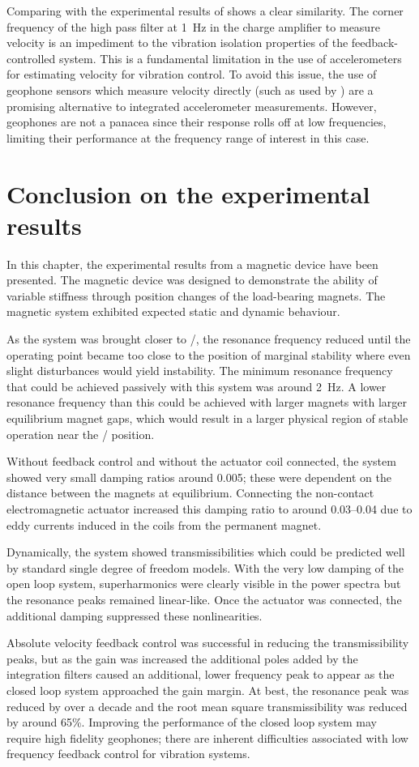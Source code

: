 \documentclass[11pt,a4paper]{memoir}
\begin{document}
Comparing  with the experimental results of  shows a clear similarity.
The corner frequency of the high pass filter at \SI{1}{Hz} in the
charge amplifier to measure velocity is an impediment to the vibration
isolation properties of the feedback-controlled system.
This is a fundamental limitation in the use of accelerometers for estimating velocity for vibration control.
To avoid this issue, the use of geophone sensors which measure velocity directly (such as used by \textcite{hong2010-rsi}) are a promising alternative to integrated accelerometer measurements.
However, geophones are not a panacea since their response rolls off at low frequencies, limiting their performance at the frequency range of interest in this case.

\section{Conclusion on the experimental results}

In this chapter, the experimental results from a magnetic device have been presented.
The magnetic device was designed to demonstrate the ability of variable stiffness through position changes of the load-bearing magnets.
The magnetic system exhibited expected static and dynamic behaviour.

As the system was brought closer to \qzs/, the resonance frequency reduced until the operating point became too close to the position of marginal stability where even slight disturbances would yield instability.
The minimum resonance frequency that could be achieved passively with this system was around \SI{2}{Hz}.
A lower resonance frequency than this could be achieved with larger magnets with larger equilibrium magnet gaps, which would result in a larger physical region of stable operation near the \qzs/ position.

Without feedback control and without the actuator coil connected, the system showed very small damping ratios around \num{0.005}; these were dependent on the distance between the magnets at equilibrium. 
Connecting the non-contact electromagnetic actuator increased this damping ratio to around \num{0.03}--\num{0.04} due to eddy currents induced in the coils from the permanent magnet.

Dynamically, the system showed transmissibilities which could be predicted well by standard single degree of freedom models.
With the very low damping of the open loop system, superharmonics were clearly visible in the power spectra but the resonance peaks remained linear-like.
Once the actuator was connected, the additional damping suppressed these nonlinearities.

Absolute velocity feedback control was successful in reducing the transmissibility peaks, but as the gain was increased the additional poles added by the integration filters caused an additional, lower frequency peak to appear as the closed loop system approached the gain margin.
At best, the resonance peak was reduced by over a decade and the root mean square transmissibility was reduced by around 65\%.
Improving the performance of the closed loop system may require high fidelity geophones; there are inherent difficulties associated with low frequency feedback control for vibration systems.
\end{document}
